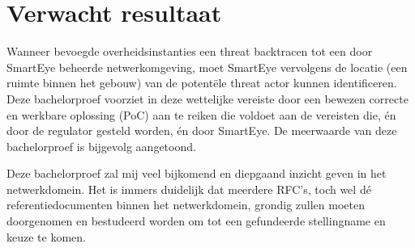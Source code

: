 \section{Verwacht resultaat}%
\label{sec:verwachte_resultaten}

Wanneer bevoegde overheidsinstanties een threat backtracen tot een door SmartEye beheerde netwerkomgeving, moet SmartEye vervolgens de locatie (een ruimte binnen het gebouw) van de potentële threat actor kunnen identificeren. Deze bachelorproef voorziet in deze wettelijke vereiste door een bewezen correcte en werkbare oplossing (PoC) aan te reiken die voldoet aan de vereisten die, én door de regulator gesteld worden, én door SmartEye. De meerwaarde van deze bachelorproef is bijgevolg aangetoond.

Deze bachelorproef zal mij veel bijkomend en diepgaand inzicht geven in het netwerkdomein. Het is immers duidelijk dat meerdere RFC’s, toch wel dé referentiedocumenten binnen het netwerkdomein, grondig zullen moeten doorgenomen en bestudeerd worden om tot een gefundeerde stellingname en keuze te komen.

